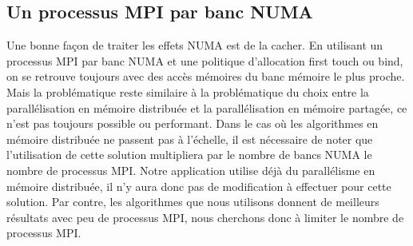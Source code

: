 \subsection{Un processus MPI par banc NUMA}
Une bonne façon de traiter les effets NUMA est de la cacher.
%
En utilisant un processus MPI par banc NUMA et une politique d'allocation first touch ou bind, on se retrouve toujours avec des accès mémoires du banc mémoire le plus proche.
%
Mais la problématique reste similaire à la problématique du choix entre la parallélisation en mémoire distribuée et la parallélisation en mémoire partagée, ce n'est pas toujours possible ou performant.
%
Dans le cas où les algorithmes en mémoire distribuée ne passent pas à l'échelle, il est nécessaire de noter que l'utilisation de cette solution multipliera par le nombre de bancs NUMA le nombre de processus MPI.
%
Notre application utilise déjà du parallélisme en mémoire distribuée, il n'y aura donc pas de modification à effectuer pour cette solution.
%
Par contre, les algorithmes que nous utilisons donnent de meilleurs résultats avec peu de processus MPI, nous cherchons donc à limiter le nombre de processus MPI.
